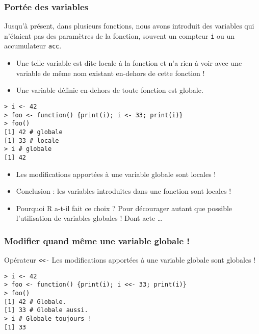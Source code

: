 \documentclass[10pt]{beamer}
\begin{document}
\begin{frame}[fragile]
  \frametitle{Portée des variables}
Jusqu'à présent, dans plusieurs fonctions, nous avons introduit des variables qui n'étaient pas des paramètres de la fonction, souvent un compteur \texttt{i} ou un accumulateur \texttt{acc}.
\begin{itemize}
\item Une telle variable est dite \alert{locale} à la fonction et n'a rien à voir avec une variable de même nom existant en-dehors de cette fonction !
\item Une variable définie en-dehors de toute fonction est \alert{globale}.
\end{itemize}

\begin{lstlisting}
> i <- 42
> foo <- function() {print(i); i <- 33; print(i)}
> foo()
[1] 42 # globale
[1] 33 # locale
> i # globale
[1] 42
\end{lstlisting}
\begin{itemize}
\item<alert@1> Les modifications apportées à une variable globale sont locales !
\item Conclusion : les variables introduites dans une fonction sont locales !
\item<alert@1> Pourquoi R a-t-il fait ce choix ? Pour décourager autant que possible l'utilisation de variables globales ! Dont acte \dots
\end{itemize}

\end{frame}


\begin{frame}[fragile]
  \frametitle{Modifier quand même une variable globale !}

  \begin{alertblock}{Opérateur \alert{\texttt{<<-}}}
    Les modifications apportées à une variable globale sont globales !
  \end{alertblock}

\begin{lstlisting}
> i <- 42
> foo <- function() {print(i); i <<- 33; print(i)}
> foo()
[1] 42 # Globale.
[1] 33 # Globale aussi.
> i # Globale toujours !
[1] 33
\end{lstlisting}
\end{frame}
\end{document}
